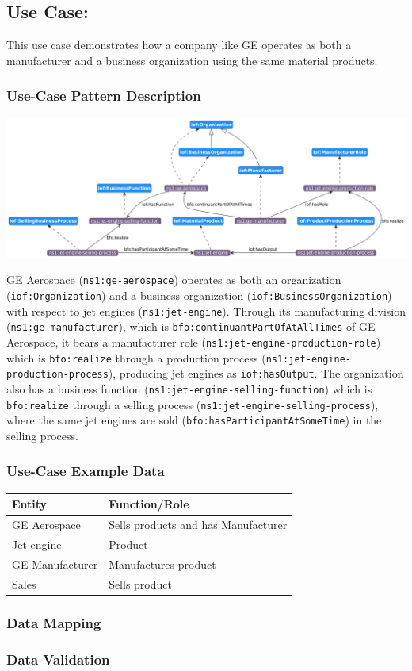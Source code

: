 \subsection*{Use Case: }

This use case demonstrates how a company like GE operates as both a manufacturer and a business organization using the same material products.

\subsubsection*{Use-Case Pattern Description}
\includegraphics[scale=0.4]{scenarios/different-type-organizations/image/different-type-organizations}

GE Aerospace (\texttt{ns1:ge-aerospace}) operates as both an organization (\texttt{iof:Organization}) and a business organization (\texttt{iof:BusinessOrganization}) with respect to jet engines (\texttt{ns1:jet-engine}). Through its manufacturing division (\texttt{ns1:ge-manufacturer}), which is \texttt{bfo:continuantPartOfAtAllTimes} of GE Aerospace, it bears a manufacturer role (\texttt{ns1:jet-engine-production-role}) which is \texttt{bfo:realize} through a production process (\texttt{ns1:jet-engine-production-process}), producing jet engines as \texttt{iof:hasOutput}. The organization also has a business function (\texttt{ns1:jet-engine-selling-function}) which is \texttt{bfo:realize} through a selling process (\texttt{ns1:jet-engine-selling-process}), where the same jet engines are sold (\texttt{bfo:hasParticipantAtSomeTime}) in the selling process.
\subsubsection*{Use-Case Example Data}


\begin{table}[h]
\label{tab:organization-structure}
\begin{tabular}{|l|l|}
\hline
Entity & Function/Role \\ \hline
GE Aerospace & Sells products and has Manufacturer \\
Jet engine & Product \\
GE Manufacturer & Manufactures product \\
Sales & Sells product \\
\hline
\end{tabular}%
\end{table}


\subsubsection*{Data Mapping}


\subsubsection*{Data Validation}
